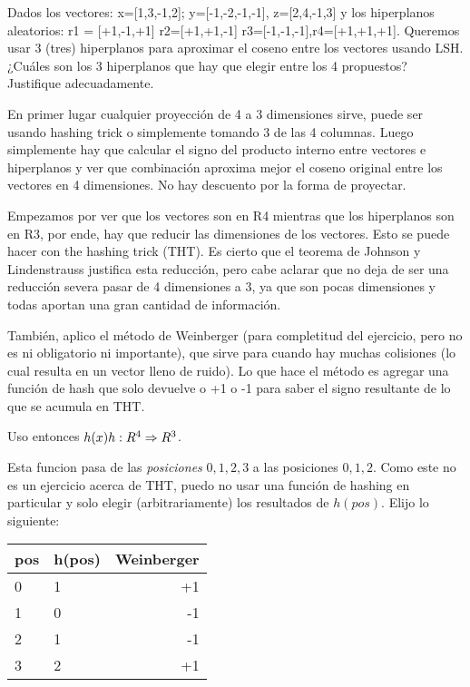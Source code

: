 \documentclass[a4paper]{article}
\newenvironment{enunciado}[3]{%
    \vspace{\baselineskip}
    \tcolorbox[beamer,%
    noparskip,breakable,
    colback=LightGreen,colframe=DarkGreen,%
    colbacklower=LimeGreen!75!LightGreen,%
    title=\small Enunciado: Año #1\, Cuatrimestre #2\, Oportunidad #3]}%
    {\endtcolorbox}
\newenvironment{criterio}[3]{%
    \tcolorbox[beamer,%
    noparskip,breakable,
    colback=LightCoral,colframe=DarkRed,%
    colbacklower=Tomato!75!LightCoral,%
    title=\small Criterio de Corrección: Año #1\, Cuatrimestre #2\, Oportunidad #3]}%
    {\endtcolorbox}
\begin{document}
    \begin{enunciado}{2016}{2}{1}
        Dados los vectores: x=[1,3,-1,2]; y=[-1,-2,-1,-1], z=[2,4,-1,3] y los hiperplanos   aleatorios:  r1  = [+1,-1,+1]  r2=[+1,+1,-1]   r3=[-1,-1,-1],r4=[+1,+1,+1]. Queremos usar 3 (tres) hiperplanos para aproximar el coseno entre los vectores usando LSH. ¿Cuáles son los 3 hiperplanos que hay que elegir entre los 4 propuestos? Justifique adecuadamente.
    \end{enunciado}

    \begin{criterio}{2016}{2}{1}
        En primer lugar cualquier proyección de 4 a 3 dimensiones sirve, puede ser usando hashing trick o simplemente tomando 3 de las 4 columnas.  Luego simplemente hay que calcular el signo del producto interno entre vectores e hiperplanos y ver que combinación aproxima mejor el coseno original entre los vectores en 4 dimensiones. No hay descuento por la forma de proyectar.
    \end{criterio}

    Empezamos por ver que los vectores son en R4 mientras que los hiperplanos son en R3, por ende, hay que reducir las dimensiones de los vectores. Esto se puede hacer con the hashing trick (THT). Es cierto que el teorema de Johnson y Lindenstrauss justifica esta reducción, pero cabe aclarar que no deja de ser una reducción severa pasar de 4 dimensiones a 3, ya que son pocas dimensiones y todas aportan una gran cantidad de información.

    También, aplico el método de Weinberger (para completitud del ejercicio, pero no es ni obligatorio ni importante), que sirve para cuando hay muchas colisiones (lo cual resulta en un vector lleno de ruido). Lo que hace el método es agregar una función de hash que solo devuelve o +1 o -1 para saber el signo resultante de lo que se acumula en THT.

    Uso entonces $h(x) \/ h:R^4 \Rightarrow  R^3$.
    
    Esta funcion pasa de las \textit{posiciones} $0,1,2,3$ a  las posiciones $0,1,2$. Como este no es un ejercicio acerca de THT, puedo no usar una función de hashing en particular y solo elegir (arbitrariamente) los resultados de $h(pos)$. Elijo lo siguiente:

    \begin{table}[H]
        \begin{tabular}{|l|l|r|}
        \hline
        pos & h(pos) & Weinberger \\
        \hline
        0   & 1      & +1         \\
        1   & 0      & -1         \\
        2   & 1      & -1         \\
        3   & 2      & +1         \\
        \hline
        \end{tabular}
    \end{table}
\end{document}
